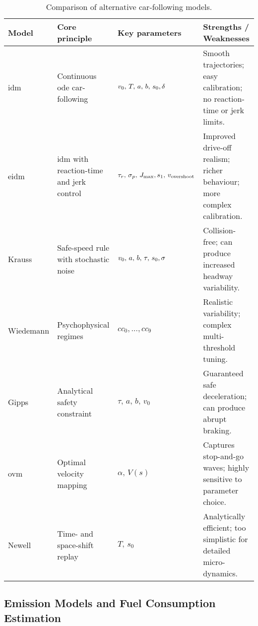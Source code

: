 \begin{table}[ht]
    \centering
    \caption{Comparison of alternative car-following models.}
    \label{tab:cf_comparison}
    \begin{tabularx}{\textwidth}{>{\raggedright\arraybackslash}p{2.2cm} >{\raggedright\arraybackslash}p{3.2cm} >{\raggedright\arraybackslash}p{2.8cm} >{\raggedright\arraybackslash}X}
        \toprule
        \textbf{Model} & \textbf{Core principle} & \textbf{Key parameters} & \textbf{Strengths / Weaknesses} \\
        \midrule
        \acs{idm} & Continuous \ac{ode} car-following & $v_0,\,T,\,a,\,b,\,s_0,\newline\delta$ & Smooth trajectories; easy calibration; no reaction-time or jerk limits. \\
        \addlinespace
        \acs{eidm} & \ac{idm} with reaction-time and jerk control & $\tau_r,\,\sigma_p,\,J_{\max},\newline s_1,\,v_{\text{overshoot}}$ & Improved drive-off realism; richer behaviour; more complex calibration. \\
        \addlinespace
        Krauss & Safe-speed rule with stochastic noise & $v_0,\,a,\,b,\,\tau,\,s_0,\newline\sigma$ & Collision-free; can produce increased headway variability. \\
        \addlinespace
        Wiedemann & Psychophysical regimes & $cc_0, \dots, cc_9$ & Realistic variability; complex multi-threshold tuning. \\
        \addlinespace
        Gipps & Analytical safety constraint & $\tau,\,a,\,b,\,v_0$ & Guaranteed safe deceleration; can produce abrupt braking. \\
        \addlinespace
        \acs{ovm} & Optimal velocity mapping & $\alpha,\,V(s)$ & Captures stop-and-go waves; highly sensitive to parameter choice. \\
        \addlinespace
        Newell & Time- and space-shift replay & $T,\,s_0$ & Analytically efficient; too simplistic for detailed micro-dynamics. \\
        \bottomrule
    \end{tabularx}
\end{table}


\subsection{Emission Models and Fuel Consumption Estimation}
\label{subsec:emission_models_fuel_estimation}

